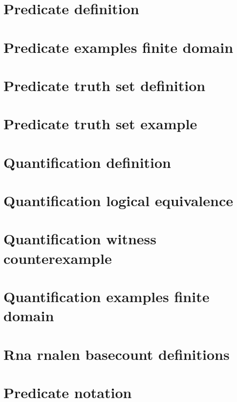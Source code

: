 \section*{Predicate definition}

\vfill
\section*{Predicate examples finite domain}

\vfill
\section*{Predicate truth set definition}

\vfill
\section*{Predicate truth set example}

\vfill
\section*{Quantification definition}

\vfill
\section*{Quantification logical equivalence}

\vfill
\section*{Quantification witness counterexample}

\vfill
\section*{Quantification examples finite domain}

\vfill
\section*{Rna rnalen basecount definitions}

\vfill
\section*{Predicate notation}

\vfill
